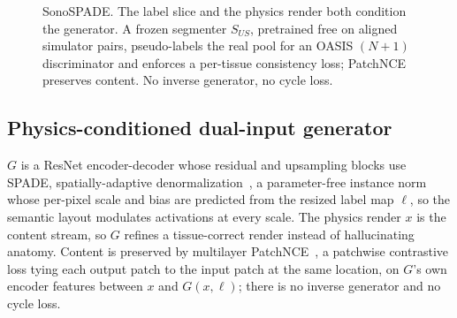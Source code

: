 \documentclass[runningheads]{llncs}
\begin{document}
\begin{figure}[t]
\centering
{}
\caption{SonoSPADE. The label slice and the physics render both condition the generator. A frozen
segmenter $S_{US}$, pretrained free on aligned simulator pairs, pseudo-labels the real pool for an OASIS
$(N{+}1)$ discriminator and enforces a per-tissue consistency loss; PatchNCE preserves content. No inverse
generator, no cycle loss.}
\label{fig:pipeline}
\end{figure}

\subsection{Physics-conditioned dual-input generator}
$G$ is a ResNet encoder-decoder whose residual and upsampling blocks use SPADE, spatially-adaptive
denormalization~\cite{park2019spade}, a parameter-free instance norm whose per-pixel scale and bias are
predicted from the resized label map $\ell$, so the semantic layout modulates activations at every scale. The physics
render $x$ is the content stream, so $G$ refines a tissue-correct render instead of hallucinating anatomy.
Content is preserved by multilayer PatchNCE~\cite{park2020cut}, a patchwise contrastive loss tying each
output patch to the input patch at the same location, on $G$'s own encoder features between $x$
and $G(x,\ell)$; there is no inverse generator and no cycle loss.
\end{document}
